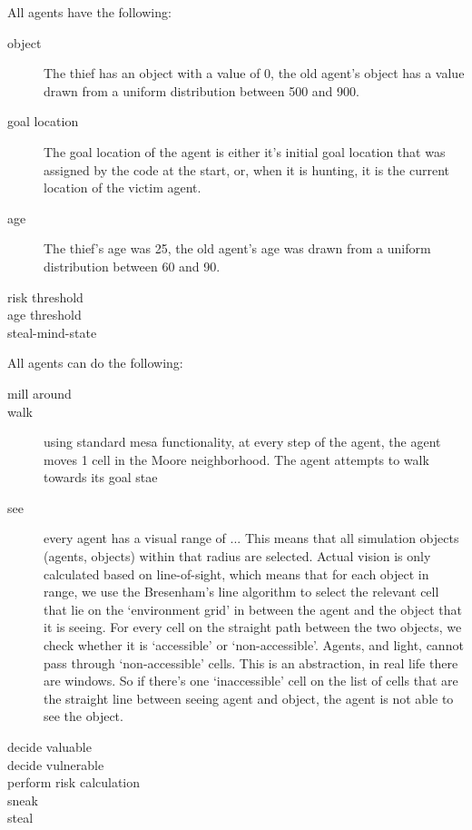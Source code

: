 \documentclass[11pt]{article}
\begin{document}
All agents have the following:
\begin{description}
\item [object] The thief has an object with a value of 0, the old agent's object has a value drawn from a uniform distribution between 500 and 900. 
\item [goal location] The goal location of the agent is either it's initial goal location that was assigned by the code at the start, or, when it is hunting, it is the current location of the victim agent.
\item [age] The thief's age was 25, the old agent's age was drawn from a uniform distribution between 60 and 90.
\item [risk threshold]
\item [age threshold]
\item [steal-mind-state]
\end{description}

All agents can do the following:

\begin{description}
\item [mill around]
\item [walk] using standard mesa functionality, at every step of the agent, the agent moves 1 cell in the Moore neighborhood. The agent attempts to walk towards its goal stae
\item [see] every agent has a visual range of ... This means that all simulation objects (agents, objects) within that radius are selected. Actual vision is only calculated based on line-of-sight, which means that for each object in range, we use the Bresenham's line algorithm to select the relevant cell that lie on the `environment grid' in between the agent and the object that it is seeing. For every cell on the straight path between the two objects, we check whether it is `accessible' or `non-accessible'. Agents, and light, cannot pass through `non-accessible' cells. This is an abstraction, in real life there are windows. So if there's one `inaccessible' cell on the list of cells that are the straight line between seeing agent and object, the agent is not able to see the object. 
\item [decide valuable] 
\item [decide vulnerable]
\item [perform risk calculation]
\item [sneak]
\item [steal]
\end{description}
\end{document}
